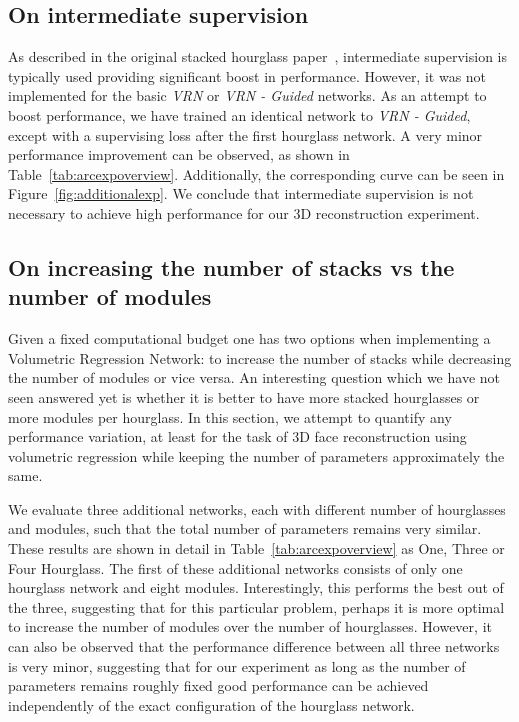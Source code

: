 \subsection{On intermediate supervision}
\label{sec:arc_intersup}

As described in the original stacked hourglass
paper~\cite{newell2016stacked}, intermediate supervision is typically
used providing significant boost in performance. However, it was not
implemented for the basic \textit{VRN} or \textit{VRN - Guided}
networks. As an attempt to boost performance, we have trained an
identical network to \textit{VRN - Guided}, except with a supervising
loss after the first hourglass network. A very minor performance
improvement can be observed, as shown in
Table~\ref{tab:arcexpoverview}. Additionally, the corresponding curve
can be seen in Figure~\ref{fig:additionalexp}. We conclude that
intermediate supervision is not necessary to achieve high performance
for our 3D reconstruction experiment.



\subsection{On increasing the number of stacks vs the number of modules}
\label{sec:arc_secvsmod}

Given a fixed computational budget one has two options when
implementing a Volumetric Regression Network: to increase the number
of stacks while decreasing the number of modules or vice versa.  An
interesting question which we have not seen answered yet is whether it
is better to have more stacked hourglasses or more modules per
hourglass. In this section, we attempt to quantify any performance
variation, at least for the task of 3D face reconstruction using
volumetric regression while keeping the number of parameters
approximately the same.

We evaluate three additional networks, each with different number of
hourglasses and modules, such that the total number of parameters
remains very similar. These results are shown in detail in
Table~\ref{tab:arcexpoverview} as One, Three or Four Hourglass. The
first of these additional networks consists of only one hourglass
network and eight modules. Interestingly, this performs the best out
of the three, suggesting that for this particular problem, perhaps it
is more optimal to increase the number of modules over the number of
hourglasses. However, it can also be observed that the performance
difference between all three networks is very minor, suggesting that
for our experiment as long as the number of parameters remains roughly
fixed good performance can be achieved independently of the exact
configuration of the hourglass network.


